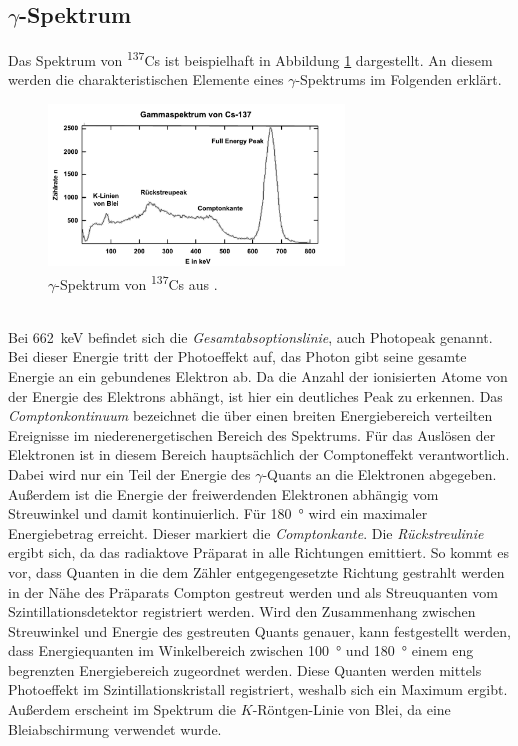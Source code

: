 \documentclass[a4paper,twoside,final]{article}
\begin{document}
\subsection{$\gamma$-Spektrum}
Das Spektrum von \textsuperscript{137}Cs ist beispielhaft in Abbildung \ref{fig:CsSpek} dargestellt. An diesem werden die charakteristischen Elemente eines $\gamma$-Spektrums im Folgenden erklärt.
\begin{figure}[htp]
    \centering
    \includegraphics[width=0.7\textwidth]{Bilder/gamma-spektrum-cs137.pdf}
    \caption{$\gamma$-Spektrum von \textsuperscript{137}Cs aus \cite{Leifi}.}
    \label{fig:CsSpek}
\end{figure}\\
Bei \SI{662}{\kilo\electronvolt} befindet sich die \textit{Gesamtabsoptionslinie}, auch Photopeak genannt. Bei dieser Energie tritt der Photoeffekt auf, das Photon gibt seine gesamte Energie an ein gebundenes Elektron ab. Da die Anzahl der ionisierten Atome von der Energie des Elektrons abhängt, ist hier ein deutliches Peak zu erkennen. Das \textit{Comptonkontinuum} bezeichnet die über einen breiten Energiebereich verteilten Ereignisse im niederenergetischen Bereich des Spektrums. Für das Auslösen der Elektronen ist in diesem Bereich hauptsächlich der Comptoneffekt verantwortlich. Dabei wird nur ein Teil der Energie des $\gamma$-Quants an die Elektronen abgegeben. Außerdem ist die Energie der freiwerdenden Elektronen abhängig vom Streuwinkel und damit kontinuierlich. Für \SI{180}{\degree} wird ein maximaler Energiebetrag erreicht. Dieser markiert die \textit{Comptonkante}. Die \textit{Rückstreulinie} ergibt sich, da das radiaktove Präparat in alle Richtungen emittiert. So kommt es vor, dass Quanten in die dem Zähler entgegengesetzte Richtung gestrahlt werden in der Nähe des Präparats Compton gestreut werden und als Streuquanten vom Szintillationsdetektor registriert werden. Wird den Zusammenhang zwischen Streuwinkel und Energie des gestreuten Quants genauer, kann festgestellt werden, dass Energiequanten im Winkelbereich zwischen \SI{100}{\degree} und \SI{180}{\degree} einem eng begrenzten Energiebereich zugeordnet werden. Diese Quanten werden mittels Photoeffekt im Szintillationskristall registriert, weshalb sich ein Maximum ergibt. Außerdem erscheint im Spektrum die $K$-Röntgen-Linie von Blei, da eine Bleiabschirmung verwendet wurde.
\end{document}

